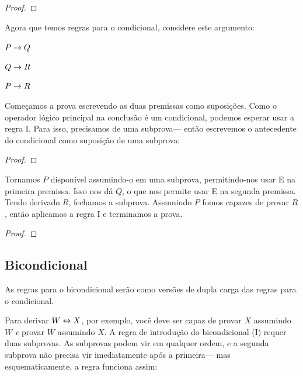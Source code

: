 \begin{proof}
	 
\end{proof}

Agora que temos regras para o condicional, considere este argumento:
\label{proofHS}
\begin{earg}
\item[] $P \rightarrow Q$
\item[] $Q \rightarrow R$
\item[\therefore] $P \rightarrow R$
\end{earg}
Começamos a prova escrevendo as duas premissas como suposições. Como o operador lógico principal na conclusão é um condicional, podemos esperar usar a regra {\eif}I. Para isso, precisamos de uma subprova--- então escrevemos o antecedente do condicional como suposição de uma subprova:

\begin{proof}
	\open
	\close
\end{proof}

Tornamos $P$ disponível assumindo-o em uma subprova, permitindo-nos usar {\eif}E na primeira premissa. Isso nos dá $Q$, o que nos permite usar {\eif}E na segunda premissa. Tendo derivado $R$, fechamos a subprova. Assumindo $P$ fomos capazes de provar $R$, então aplicamos a regra {\eif}I e terminamos a prova.

\label{HSproof}
\begin{proof}
	\open
	\close
\end{proof}





\subsection{Bicondicional}
As regras para o bicondicional serão como versões de dupla carga das regras para o condicional.

Para derivar $W \leftrightarrow X$, por exemplo, você deve ser capaz de provar $X$ assumindo $W$ \emph{e} provar $W$ assumindo $X$. A regra de introdução do bicondicional ({\eiff}I) requer duas subprovas. As subprovas podem vir em qualquer ordem, e a segunda subprova não precisa vir imediatamente após a primeira--- mas esquematicamente, a regra funciona assim:

